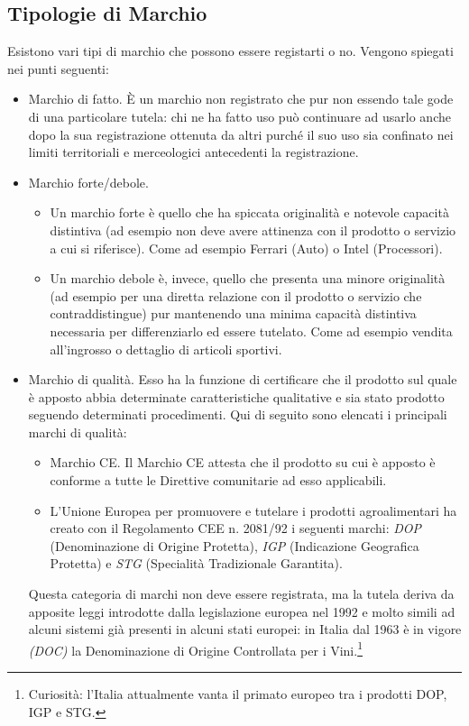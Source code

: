 \subsection{Tipologie di Marchio}
Esistono vari tipi di marchio che possono essere registarti o no. Vengono spiegati nei punti seguenti:
\begin{itemize}
 \item Marchio di fatto. \`E un marchio non registrato che pur non essendo tale gode di una particolare tutela: chi ne ha fatto uso può continuare ad usarlo anche dopo la sua registrazione ottenuta da altri purché il suo uso sia confinato nei limiti territoriali e merceologici antecedenti la registrazione.
 \item Marchio forte/debole.
	\begin{itemize}
	 \item Un marchio forte è quello che ha spiccata originalità e notevole capacità distintiva (ad esempio non deve avere attinenza con il prodotto o servizio a cui si riferisce). Come ad esempio Ferrari (Auto) o Intel (Processori).
	\item Un marchio debole è, invece, quello che presenta una minore originalità (ad esempio per una diretta relazione con il prodotto o servizio che contraddistingue) pur mantenendo una minima capacità distintiva necessaria per differenziarlo ed essere tutelato. Come ad esempio vendita all'ingrosso o dettaglio di articoli sportivi.
	\end{itemize}

\item Marchio di qualità. Esso ha la funzione di certificare che il prodotto sul quale è apposto abbia determinate caratteristiche qualitative e sia stato prodotto seguendo determinati procedimenti. Qui di seguito sono elencati i principali marchi di qualità:

	\begin{itemize}
	\item Marchio CE. Il Marchio CE attesta che il prodotto su cui è apposto è conforme a tutte le Direttive comunitarie ad esso applicabili.
	\item L'Unione Europea per promuovere e tutelare i prodotti agroalimentari ha creato con il Regolamento CEE n. 2081/92 i seguenti marchi: \textit{DOP} (Denominazione di Origine Protetta), \textit{IGP} (Indicazione Geografica Protetta) e \textit{STG} (Specialità Tradizionale Garantita).
	\end{itemize}

Questa categoria di marchi non deve essere registrata, ma la tutela deriva da apposite leggi introdotte dalla legislazione europea nel 1992 e molto simili ad alcuni sistemi già presenti in alcuni stati europei: in Italia dal 1963 è in vigore \textit{(DOC)} la Denominazione di Origine Controllata per i Vini.\footnote{Curiosità: l'Italia attualmente vanta il primato europeo tra i prodotti DOP, IGP e STG.}



\end{itemize}

